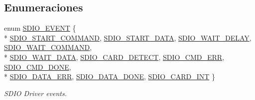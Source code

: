 \subsection*{Enumeraciones}
\begin{DoxyCompactItemize}
\item 
enum \hyperlink{group___s_d_i_o__18_x_x__43_x_x_gadd0623c80c89d5be930a9a40f0bd8f38}{S\+D\+I\+O\+\_\+\+E\+V\+E\+NT} \{ \\*
\hyperlink{group___s_d_i_o__18_x_x__43_x_x_ggadd0623c80c89d5be930a9a40f0bd8f38a8a83b055ba4185eb141508ca79afcc22}{S\+D\+I\+O\+\_\+\+S\+T\+A\+R\+T\+\_\+\+C\+O\+M\+M\+A\+ND}, 
\hyperlink{group___s_d_i_o__18_x_x__43_x_x_ggadd0623c80c89d5be930a9a40f0bd8f38a74d37a488f06160d459ee4db0b6cb870}{S\+D\+I\+O\+\_\+\+S\+T\+A\+R\+T\+\_\+\+D\+A\+TA}, 
\hyperlink{group___s_d_i_o__18_x_x__43_x_x_ggadd0623c80c89d5be930a9a40f0bd8f38ae567107e0a2a9b770eed107b8002b1d1}{S\+D\+I\+O\+\_\+\+W\+A\+I\+T\+\_\+\+D\+E\+L\+AY}, 
\hyperlink{group___s_d_i_o__18_x_x__43_x_x_ggadd0623c80c89d5be930a9a40f0bd8f38a460f44596d67bec67ed83439e869bb90}{S\+D\+I\+O\+\_\+\+W\+A\+I\+T\+\_\+\+C\+O\+M\+M\+A\+ND}, 
\\*
\hyperlink{group___s_d_i_o__18_x_x__43_x_x_ggadd0623c80c89d5be930a9a40f0bd8f38aad36dba6055fad2231e2dc6ab9b1e200}{S\+D\+I\+O\+\_\+\+W\+A\+I\+T\+\_\+\+D\+A\+TA}, 
\hyperlink{group___s_d_i_o__18_x_x__43_x_x_ggadd0623c80c89d5be930a9a40f0bd8f38a5348f869808572a863ddca168dcbd147}{S\+D\+I\+O\+\_\+\+C\+A\+R\+D\+\_\+\+D\+E\+T\+E\+CT}, 
\hyperlink{group___s_d_i_o__18_x_x__43_x_x_ggadd0623c80c89d5be930a9a40f0bd8f38a5f4cd2f68ea797b7c619742d250eb6b0}{S\+D\+I\+O\+\_\+\+C\+M\+D\+\_\+\+E\+RR}, 
\hyperlink{group___s_d_i_o__18_x_x__43_x_x_ggadd0623c80c89d5be930a9a40f0bd8f38ad4e7a4c5f03c933dfb21ea2c8d1469fe}{S\+D\+I\+O\+\_\+\+C\+M\+D\+\_\+\+D\+O\+NE}, 
\\*
\hyperlink{group___s_d_i_o__18_x_x__43_x_x_ggadd0623c80c89d5be930a9a40f0bd8f38a59ad596446cc953b5f1a8558d1d038a5}{S\+D\+I\+O\+\_\+\+D\+A\+T\+A\+\_\+\+E\+RR}, 
\hyperlink{group___s_d_i_o__18_x_x__43_x_x_ggadd0623c80c89d5be930a9a40f0bd8f38a1607b688dd67ce760ad8d4eefbac0303}{S\+D\+I\+O\+\_\+\+D\+A\+T\+A\+\_\+\+D\+O\+NE}, 
\hyperlink{group___s_d_i_o__18_x_x__43_x_x_ggadd0623c80c89d5be930a9a40f0bd8f38af9acdeff09fe6e5c2cd9826f36d27168}{S\+D\+I\+O\+\_\+\+C\+A\+R\+D\+\_\+\+I\+NT}
 \}\begin{DoxyCompactList}\small\item\em S\+D\+IO Driver events. \end{DoxyCompactList}
\end{DoxyCompactItemize}
